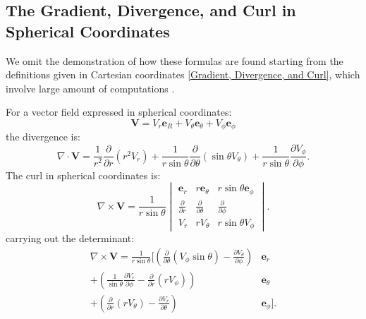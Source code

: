 \subsection{The Gradient, Divergence, and Curl in Spherical Coordinates}
We omit the demonstration of how these formulas are found starting from the definitions given in Cartesian coordinates \ref{Gradient, Divergence, and Curl}, which involve large amount of computations \cite{book-magnetism}.

For a vector field expressed in spherical coordinates:
\[
 \mathbf{V} = V_r \mathbf{e}_R + V_\theta \mathbf{e}_{\theta} + V_\phi \mathbf{e}_\phi 
 \] the divergence is:
\begin{equation}
    \nabla \cdot \mathbf{V} = \frac{1}{r^2} \frac{\partial}{\partial r} (r^2 V_r) + \frac{1}{r \sin \theta} \frac{\partial}{\partial \theta} (\sin \theta V_\theta) + \frac{1}{r \sin \theta} \frac{\partial V_\phi}{\partial \phi}.
\end{equation}
The curl in spherical coordinates is:
\begin{equation}
    \nabla \times \mathbf{V} = \frac{1}{r \sin \theta} \begin{vmatrix} 
         \mathbf{e}_r & r  \mathbf{e}_\theta & r \sin \theta  \mathbf{e}_\phi \\ 
        \frac{\partial}{\partial r} & \frac{\partial}{\partial \theta} & \frac{\partial}{\partial \phi} \\ 
        V_r & r V_\theta & r \sin \theta V_\phi 
    \end{vmatrix}.
    \label{curl_spher}
\end{equation}
carrying out the determinant:
\begin{equation}
\begin{aligned}
    \nabla \times \mathbf{V} = \frac{1}{r \sin \theta} \Bigg[ 
        \left( \frac{\partial}{\partial \theta} (V_\phi \sin \theta) - \frac{\partial V_\theta}{\partial \phi} \right)  &\mathbf{e}_r \\
         + \left( \frac{1}{\sin \theta} \frac{\partial V_r}{\partial \phi} - \frac{\partial}{\partial r} (r V_\phi) \right)  &\mathbf{e}_\theta \\
         + \left( \frac{\partial}{\partial r} (r V_\theta) - \frac{\partial V_r}{\partial \theta} \right)  &\mathbf{e}_\phi 
    \Bigg].
\end{aligned}
\end{equation}

